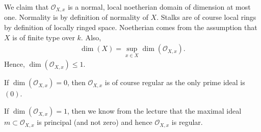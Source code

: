 \newcommand{\sheet}{11}




\maketitle{}

\begin{exercise}{1}
    We claim that $\mathcal{O}_{X,x}$ is a normal, local noetherian domain of dimension at most one. 
    Normality is by definition of normality of $X$. Stalks are of course local rings by definition of locally ringed space.
    Noetherian comes from the assumption that $X$ is of finite type over $k$. Also, 
    \begin{align*}
        \dim(X)=\sup_{x\in X}\dim(\mathcal{O}_{X,x}).
    \end{align*}
    Hence, $\dim(\mathcal{O}_{X,x})\le 1$.

    If $\dim(\mathcal{O}_{X,x})= 0$, then $\mathcal{O}_{X,x}$ is of course regular as the only prime ideal is $(0)$.

    If $\dim(\mathcal{O}_{X,x})= 1$, then we know from the lecture that the maximal ideal $m \subset \mathcal{O}_{X,x}$
    is principal (and not zero) and hence $\mathcal{O}_{X,x}$ is regular.
\end{exercise}


